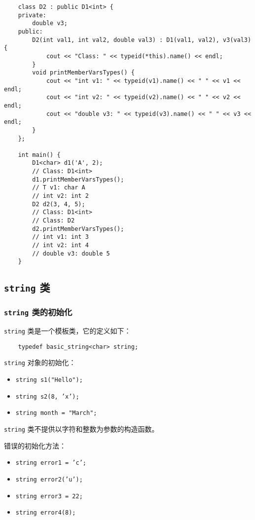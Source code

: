 \documentclass[UTF8]{ctexart}
\begin{document}
\begin{enumerate}
\begin{verbatim}
    class D2 : public D1<int> {
    private:
        double v3;
    public:
        D2(int val1, int val2, double val3) : D1(val1, val2), v3(val3) {
            cout << "Class: " << typeid(*this).name() << endl;
        }
        void printMemberVarsTypes() {
            cout << "int v1: " << typeid(v1).name() << " " << v1 << endl;
            cout << "int v2: " << typeid(v2).name() << " " << v2 << endl;
            cout << "double v3: " << typeid(v3).name() << " " << v3 << endl;
        }
    };

    int main() {
        D1<char> d1('A', 2);
        // Class: D1<int>
        d1.printMemberVarsTypes();
        // T v1: char A
        // int v2: int 2
        D2 d2(3, 4, 5);
        // Class: D1<int>
        // Class: D2
        d2.printMemberVarsTypes();
        // int v1: int 3
        // int v2: int 4
        // double v3: double 5
    }
    \end{verbatim}
\end{enumerate}

\subsection{\texttt{string} 类}
\subsubsection{\texttt{string} 类的初始化}
\texttt{string} 类是一个模板类，它的定义如下：
\begin{verbatim}
    typedef basic_string<char> string;
\end{verbatim}

\texttt{string} 对象的初始化：
\begin{itemize}
    \item \texttt{string s1("Hello");}
    \item \texttt{string s2(8, 'x');}
    \item \texttt{string month = "March";}
\end{itemize}

\texttt{string} 类不提供以字符和整数为参数的构造函数。

错误的初始化方法：
\begin{itemize}
    \item \texttt{string error1 = 'c';}
    \item \texttt{string error2('u');}
    \item \texttt{string error3 = 22;}
    \item \texttt{string error4(8);}
\end{itemize}
\end{document}
